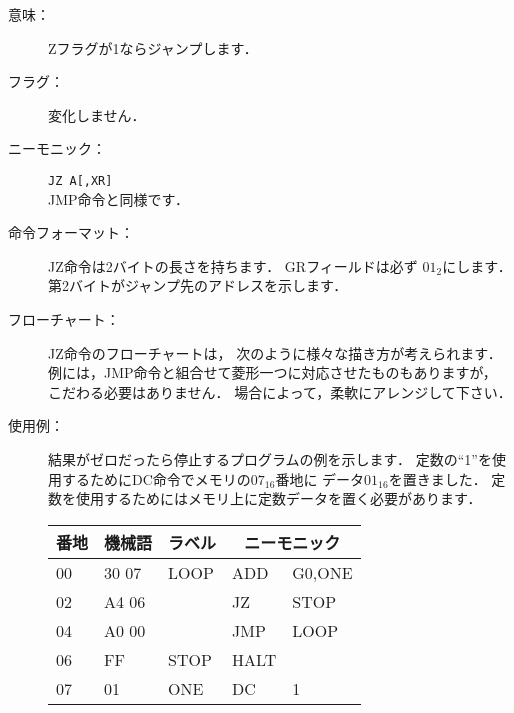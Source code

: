 \begin{description}
\item[意味：]Zフラグが1ならジャンプします．

\item[フラグ：]変化しません．

\item[ニーモニック：]{\tt JZ A[,XR]} \\
JMP命令と同様です．

\item[命令フォーマット：]JZ命令は2バイトの長さを持ちます．
GRフィールドは必ず $01_2$にします．
第2バイトがジャンプ先のアドレスを示します．


\item[フローチャート：]JZ命令のフローチャートは，
次のように様々な描き方が考えられます．
例には，JMP命令と組合せて菱形一つに対応させたものもありますが，
こだわる必要はありません．
場合によって，柔軟にアレンジして下さい．

\begin{center}
\end{center}

\item[使用例：]
結果がゼロだったら停止するプログラムの例を示します．
定数の``1''を使用するためにDC命令でメモリの$07_{16}$番地に
データ$01_{16}$を置きました．
定数を使用するためにはメモリ上に定数データを置く必要があります．

{\tt\small\begin{center}
\begin{tabular}{|l|l|l|l l|} \hline
番地 & 機械語 & ラベル & \multicolumn{2}{|c|}{ニーモニック} \\
\hline
00 & 30 07 & LOOP & ADD  & G0,ONE  \\
02 & A4 06 &      & JZ   & STOP    \\
04 & A0 00 &      & JMP  & LOOP    \\
06 & FF    & STOP & HALT &         \\
07 & 01    & ONE  & DC   & 1       \\
\hline
\end{tabular}
\end{center}}
\end{description}

